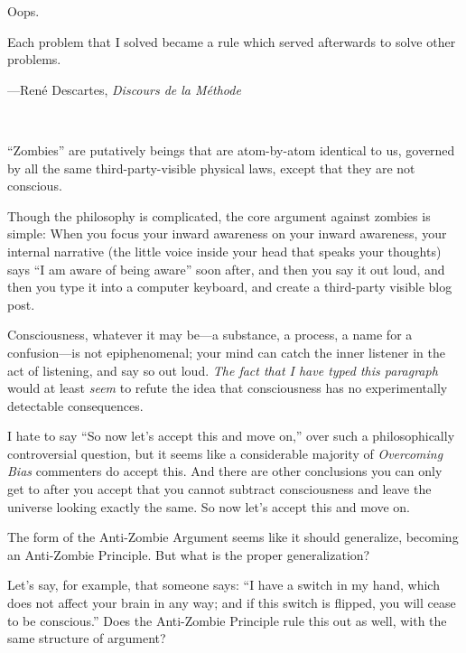 {
 Oops.}

\myendsectiontext


{
 Each problem that I solved became a rule which served afterwards
to solve other problems.}

{\raggedleft
 {}---René Descartes, \textit{Discours de la
Méthode}
\par}


\bigskip

{
 ~}

{
 ``Zombies'' are putatively
beings that are atom-by-atom identical to us, governed by all the same
third-party-visible physical laws, except that they are not conscious.}

{
 Though the philosophy is complicated, the core argument against
zombies is simple: When you focus your inward awareness on your inward
awareness, your internal narrative (the little voice inside your head
that speaks your thoughts) says ``I am aware of being
aware'' soon after, and then you say it out loud, and
then you type it into a computer keyboard, and create a third-party
visible blog post.}

{
 Consciousness, whatever it may be---a substance, a process, a name
for a confusion---is not epiphenomenal; your mind can catch the inner
listener in the act of listening, and say so out loud. \textit{The fact
that I have typed this paragraph} would at least \textit{seem} to
refute the idea that consciousness has no experimentally detectable
consequences.}

{
 I hate to say ``So now let's
accept this and move on,'' over such a
philosophically controversial question, but it seems like a
considerable majority of \textit{Overcoming Bias} commenters do accept
this. And there are other conclusions you can only get to after you
accept that you cannot subtract consciousness and leave the universe
looking exactly the same. So now let's accept this and
move on.}

{
 The form of the Anti-Zombie Argument seems like it should
generalize, becoming an Anti-Zombie Principle. But what is the proper
generalization?}

{
 Let's say, for example, that someone says:
``I have a switch in my hand, which does not affect
your brain in any way; and if this switch is flipped, you will cease to
be conscious.'' Does the Anti-Zombie Principle rule
this out as well, with the same structure of argument?}

